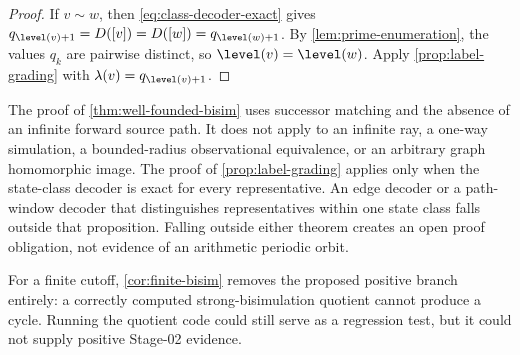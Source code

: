 \begin{proof}
If $v\sim w$, then \eqref{eq:class-decoder-exact} gives
$q_{\level(v)+1}=D([v])=D([w])=q_{\level(w)+1}$.  By
\cref{lem:prime-enumeration}, the values $q_k$ are pairwise distinct, so
$\level(v)=\level(w)$.  Apply \cref{prop:label-grading} with
$\lambda(v)=q_{\level(v)+1}$.
\end{proof}

\begin{remark}
The proof of \cref{thm:well-founded-bisim} uses successor matching and the
absence of an infinite forward source path.  It does not apply to an infinite
ray, a one-way simulation, a bounded-radius observational equivalence, or an
arbitrary graph homomorphic image.  The proof of
\cref{prop:label-grading} applies only when the state-class decoder is exact
for every representative.  An edge decoder or a path-window decoder that
distinguishes representatives within one state class falls outside that
proposition.  Falling outside either theorem creates an open proof
obligation, not evidence of an arithmetic periodic orbit.
\end{remark}

For a finite cutoff, \cref{cor:finite-bisim} removes the proposed positive
branch entirely: a correctly computed strong-bisimulation quotient cannot
produce a cycle.  Running the quotient code could still serve as a regression
test, but it could not supply positive Stage-02 evidence.
